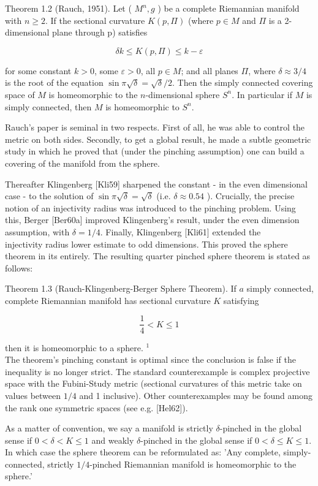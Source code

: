 \documentclass[10pt, letterpaper]{article}
\begin{document}
Theorem 1.2 (Rauch, 1951). Let ( $M^{n}, g$ ) be a complete Riemannian manifold with $n \geq 2$. If the sectional curvature $K(p, \Pi)$ (where $p \in M$ and $\Pi$ is a 2-dimensional plane through p) satisfies

$$
\delta k \leq K(p, \Pi) \leq k-\varepsilon
$$

for some constant $k>0$, some $\varepsilon>0$, all $p \in M$; and all planes $\Pi$, where $\delta \approx 3 / 4$ is the root of the equation $\sin \pi \sqrt{\delta}=\sqrt{\delta} / 2$. Then the simply connected covering space of $M$ is homeomorphic to the $n$-dimensional sphere $S^{n}$. In particular if $M$ is simply connected, then $M$ is homeomorphic to $S^{n}$.

Rauch's paper is seminal in two respects. First of all, he was able to control the metric on both sides. Secondly, to get a global result, he made a subtle geometric study in which he proved that (under the pinching assumption) one can build a covering of the manifold from the sphere.

Thereafter Klingenberg [Kli59] sharpened the constant - in the even dimensional case - to the solution of $\sin \pi \sqrt{\delta}=\sqrt{\delta}$ (i.e. $\delta \approx 0.54$ ). Crucially, the precise notion of an injectivity radius was introduced to the pinching problem. Using this, Berger [Ber60a] improved Klingenberg's result, under the even dimension assumption, with $\delta=1 / 4$. Finally, Klingenberg [Kli61] extended the\\
injectivity radius lower estimate to odd dimensions. This proved the sphere theorem in its entirely. The resulting quarter pinched sphere theorem is stated as follows:

Theorem 1.3 (Rauch-Klingenberg-Berger Sphere Theorem). If $a$ simply connected, complete Riemannian manifold has sectional curvature $K$ satisfying

$$
\frac{1}{4}<K \leq 1
$$

then it is homeomorphic to a sphere. ${ }^{1}$\\
The theorem's pinching constant is optimal since the conclusion is false if the inequality is no longer strict. The standard counterexample is complex projective space with the Fubini-Study metric (sectional curvatures of this metric take on values between $1 / 4$ and 1 inclusive). Other counterexamples may be found among the rank one symmetric spaces (see e.g. [Hel62]).

As a matter of convention, we say a manifold is strictly $\delta$-pinched in the global sense if $0<\delta<K \leq 1$ and weakly $\delta$-pinched in the global sense if $0<\delta \leq K \leq 1$. In which case the sphere theorem can be reformulated as: 'Any complete, simply-connected, strictly $1 / 4$-pinched Riemannian manifold is homeomorphic to the sphere.'
\end{document}
